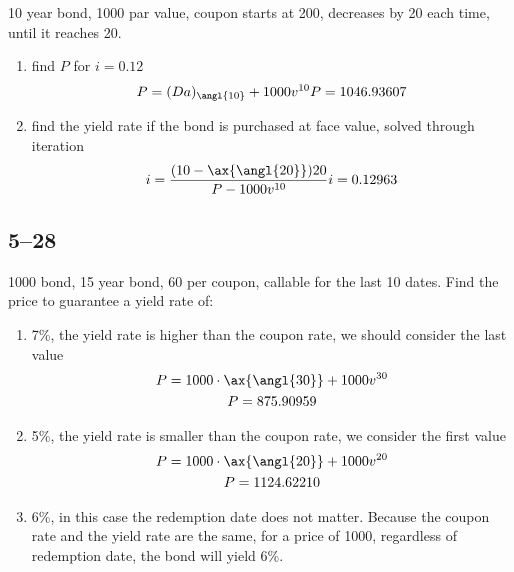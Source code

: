 \documentclass[a4paper, 12pt, reqno]{amsart}
\begin{document}
10 year bond, 1000 par value, coupon starts at 200, decreases by 20 each time,
until it reaches 20.
\begin{enumerate}
    \item find $P$ for $i = 0.12$
        \begin{equation}\nonumber
            \begin{gathered}
                P = (Da)_{\angl{10}} + 1000 v^{10}
                P = 1046.93607
            \end{gathered}
        \end{equation}
    \item find the yield rate if the bond is purchased at face value, solved
        through iteration
        \begin{equation}\nonumber
            \begin{gathered}
                i = \frac{(10 - \ax{\angl{20}}) 20}{P - 1000v^{10}}
                i = 0.12963
            \end{gathered}
        \end{equation}
\end{enumerate}

\subsection*{5--28}

1000 bond, 15 year bond, 60 per coupon, callable for the last 10 dates. Find
the price to guarantee a yield rate of:
\begin{enumerate}
    \item 7\%, the yield rate is higher than the coupon rate, we should
        consider the last value
        \begin{equation}\nonumber
            \begin{gathered}
                P = 1000 \cdot \ax{\angl{30}} + 1000 v^{30}     \\
                P = 875.90959
            \end{gathered}
        \end{equation}
    \item 5\%, the yield rate is smaller than the coupon rate, we consider the
        first value
        \begin{equation}\nonumber
            \begin{gathered}
                P = 1000 \cdot \ax{\angl{20}} + 1000 v^{20}     \\
                P = 1124.62210
            \end{gathered}
        \end{equation}
    \item 6\%, in this case the redemption date does not matter. Because the
        coupon rate and the yield rate are the same, for a price of 1000,
        regardless of redemption date, the bond will yield 6\%.
\end{enumerate}
\end{document}
